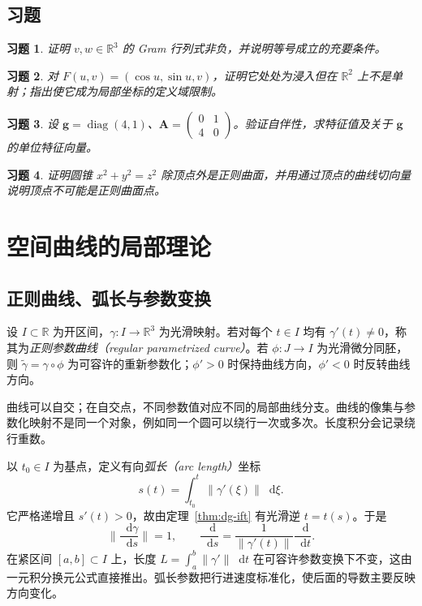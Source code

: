 \documentclass[UTF8,12pt,a4paper,fontset=fandol]{ctexbook}
\newcommand{\R}{\mathbb R}
\newcommand{\dd}{\mathop{}\!\mathrm d}
\newcommand{\norm}[1]{\lVert #1\rVert}
\newtheorem{exercise}{习题}[chapter]
\begin{document}
\section{习题}
\begin{exercise}\label{ex:dg-tools-gram}
证明 $v,w\in\R^3$ 的 Gram 行列式非负，并说明等号成立的充要条件。
\end{exercise}
\begin{exercise}\label{ex:dg-tools-immersion}
对 $F(u,v)=(\cos u,\sin u,v)$，证明它处处为浸入但在 $\R^2$ 上不是单射；指出使它成为局部坐标的定义域限制。
\end{exercise}
\begin{exercise}\label{ex:dg-tools-selfadjoint}
设 $\mathbf g=\operatorname{diag}(4,1)$、$\mathbf A=\begin{pmatrix}0&1\\4&0\end{pmatrix}$。验证自伴性，求特征值及关于 $\mathbf g$ 的单位特征向量。
\end{exercise}
\begin{exercise}\label{ex:dg-tools-cone}
证明圆锥 $x^2+y^2=z^2$ 除顶点外是正则曲面，并用通过顶点的曲线切向量说明顶点不可能是正则曲面点。
\end{exercise}

\chapter{空间曲线的局部理论}
\label{chap:dg-curves}

\section{正则曲线、弧长与参数变换}
\begin{definition}[正则参数曲线]
设 $I\subset\R$ 为开区间，$\gamma:I\to\R^3$ 为光滑映射。若对每个 $t\in I$ 均有 $\gamma'(t)\ne0$，称其为\emph{正则参数曲线（regular parametrized curve）}。若 $\phi:J\to I$ 为光滑微分同胚，则 $\widetilde\gamma=\gamma\circ\phi$ 为可容许的重新参数化；$\phi'>0$ 时保持曲线方向，$\phi'<0$ 时反转曲线方向。
\end{definition}
曲线可以自交；在自交点，不同参数值对应不同的局部曲线分支。曲线的像集与参数化映射不是同一个对象，例如同一个圆可以绕行一次或多次。长度积分会记录绕行重数。

以 $t_0\in I$ 为基点，定义有向\emph{弧长（arc length）}坐标
\[
 s(t)=\int_{t_0}^t\norm{\gamma'(\xi)}\dd\xi.
\]
它严格递增且 $s'(t)>0$，故由定理~\ref{thm:dg-ift} 有光滑逆 $t=t(s)$。于是
\begin{equation}
 \norm{\frac{\dd\gamma}{\dd s}}=1,
 \qquad \frac{\dd}{\dd s}=\frac1{\norm{\gamma'(t)}}\frac{\dd}{\dd t}.
 \label{eq:dg-arclength}
\end{equation}
在紧区间 $[a,b]\subset I$ 上，长度 $L=\int_a^b\norm{\gamma'}\dd t$ 在可容许参数变换下不变，这由一元积分换元公式直接推出。弧长参数把行进速度标准化，使后面的导数主要反映方向变化。
\end{document}
